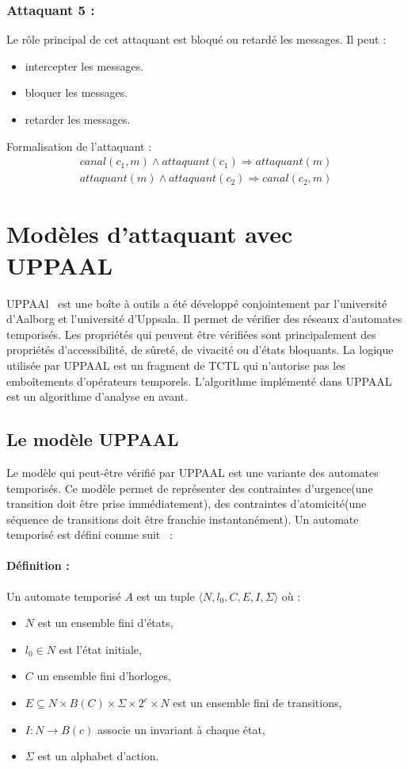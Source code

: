 \documentclass[10pt,a4paper]{article}
\begin{document}
\subsubsection{Attaquant 5 :}
Le rôle principal de cet attaquant est bloqué ou retardé les messages. Il peut :
\begin{itemize}
\item intercepter les messages.
\item bloquer les messages.
\item retarder les messages.\\
\end{itemize}
Formalisation de l'attaquant :   
\[
\begin{array}{l}
canal(c_{1},m)\wedge attaquant(c_{1})\Longrightarrow attaquant(m)\\
attaquant(m)\wedge attaquant(c_{2})\Longrightarrow canal(c_{2},m) 
\end{array}
\]

\section{Modèles d'attaquant avec UPPAAL}
UPPAAl~\cite{ref4} est une bo\^{i}te à outils a été développé conjointement par l'université d'Aalborg et l'université d'Uppsala. Il permet de vérifier des réseaux d'automates temporisés. Les propriétés qui peuvent \^{e}tre vérifiées sont principalement des propriétés d'accessibilité, de sûreté, de vivacité ou d'états bloquants. La logique utilisée par UPPAAL est un fragment de TCTL qui n'autorise pas les embo\^{i}tements d'opérateurs temporels. L'algorithme implémenté dans UPPAAL est un algorithme d'analyse en avant.
   
\subsection{Le modèle UPPAAL}
Le modèle qui peut-\^{e}tre vérifié par UPPAAL est une variante des automates temporisés. Ce modèle permet de représenter des contraintes d'urgence(une transition doit \^{e}tre prise immédiatement), des contraintes d'atomicité(une séquence de transitions doit \^{e}tre franchie instantanément). Un automate temporisé est défini comme suit~\cite{ref5} :
\paragraph{Définition :}
Un automate temporisé $A$ est un tuple $\langle N, l_{0}, C, E, I, \Sigma \rangle$ o\`{u} :
\begin{itemize}
\item $N$ est un ensemble fini d'états,
\item $l_{0} \in N$ est l'état initiale,
\item $C$ un ensemble fini d'horloges,
\item $E \subseteq N \times B(C) \times \Sigma \times 2^c \times N$ est un ensemble fini de transitions, 
\item $I : N \longrightarrow B(c)$ associe un invariant à chaque état,
\item $\Sigma$ est un alphabet d'action.\newline
\end{itemize}
\end{document}
